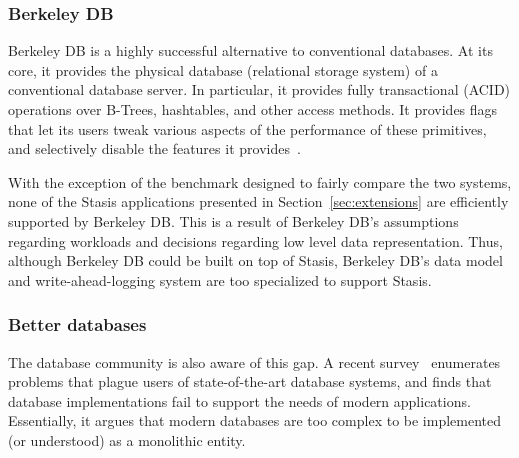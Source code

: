 \documentclass[letterpaper,twocolumn,10pt]{article}
\newcommand{\yad}{Stasis\xspace}
\begin{document}
\subsubsection{Berkeley DB}


Berkeley DB is a highly successful alternative to conventional
databases.  At its core, it provides the physical database
(relational storage system) of a conventional database server.
In particular, 
it provides fully transactional (ACID) operations over B-Trees, 
hashtables, and other access methods.  It provides flags that 
let its users tweak various aspects of the performance of these
primitives, and selectively disable the features it provides~\cite{libtp}.

With the
exception of the benchmark designed to fairly compare the two systems, none of the \yad 
applications presented in Section~\ref{sec:extensions} are efficiently
supported by Berkeley DB.   This is a result of Berkeley DB's  
assumptions regarding workloads and decisions regarding low level data
representation.  Thus, although Berkeley DB could be built on top of \yad,
Berkeley DB's data model and write-ahead-logging system are too specialized to support \yad.




\subsubsection{Better databases}

The database community is also aware of this gap. 
A recent survey~\cite{riscDB} enumerates problems that plague users of
state-of-the-art database systems, and finds that database implementations fail to support the
needs of modern applications.  Essentially, it argues that modern 
databases are too complex to be implemented (or understood) 
as a monolithic entity.
\end{document}
